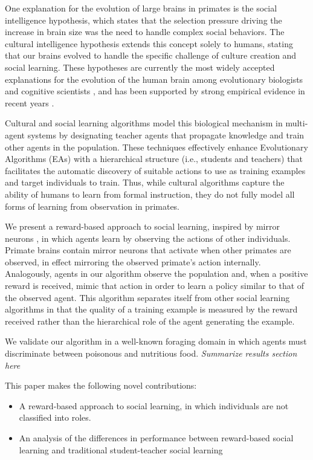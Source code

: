 \documentclass{acm_proc_article-sp}
\begin{document}
One explanation for the evolution of large brains in primates is the social intelligence hypothesis, which states that the selection pressure driving the increase in brain size was the need to handle complex social behaviors. The cultural intelligence hypothesis extends this concept solely to humans, stating that our brains evolved to handle the specific challenge of culture creation and social learning. These hypotheses are currently the most widely accepted explanations for the evolution of the human brain among evolutionary biologists and cognitive scientists \cite{holekamp2007questioning}, and has been supported by strong empirical evidence in recent years \cite{herrmann2007humans}.

Cultural and social learning algorithms \cite{reynolds1994introduction} model this biological mechanism in multi-agent systems by designating teacher agents that propagate knowledge and train other agents in the population. These techniques effectively enhance Evolutionary Algorithms (EAs) with a hierarchical structure (i.e., students and teachers) that facilitates the automatic discovery of suitable actions to use as training examples and target individuals to train. Thus, while cultural algorithms capture the ability of humans to learn from formal instruction, they do not fully model all forms of learning from observation in primates.

We present a reward-based approach to social learning, inspired by mirror neurons \cite{gallese-98}, in which agents learn by observing the actions of other individuals. Primate brains contain mirror neurons that activate when other primates are observed, in effect mirroring the observed primate's action internally. Analogously, agents in our algorithm observe the population and, when a positive reward is received, mimic that action in order to learn a policy similar to that of the observed agent. This algorithm separates itself from other social learning algorithms in that the quality of a training example is measured by the reward received rather than the hierarchical role of the agent generating the example.

We validate our algorithm in a well-known foraging domain in which agents must discriminate between poisonous and nutritious food. \textit{Summarize results section here}

This paper makes the following novel contributions:
 
\begin{itemize}
\item A reward-based approach to social learning, in which individuals are not classified into roles.
\item An analysis of the differences in performance between reward-based social learning and traditional student-teacher social learning
\end{itemize}
 
\end{document}
